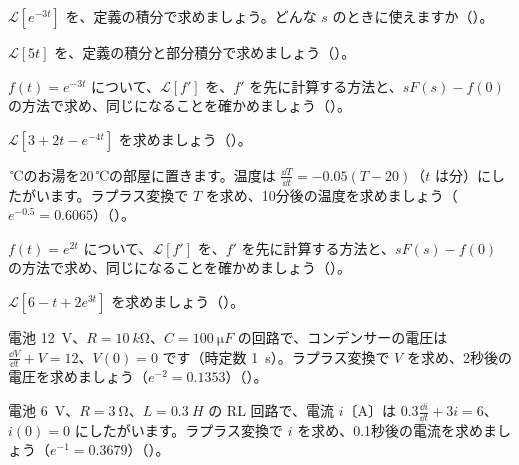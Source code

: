 \bkendproblems
{}

\bkproblem $\mathcal L[e^{-3t}]$ を、定義の積分で求めましょう。どんな $s$ のときに使えますか\mbox{（）}。

\bkproblem $\mathcal L[5t]$ を、定義の積分と部分積分で求めましょう\mbox{（）}。

\bkproblem $f(t)=e^{-3t}$ について、$\mathcal L[f']$ を、$f'$ を先に計算する方法と、$sF(s)-f(0)$ の方法で求め、同じになることを確かめましょう\mbox{（）}。

\bkproblem $\mathcal L[3+2t-e^{-4t}]$ を求めましょう\mbox{（）}。

\,℃のお湯を20\,℃の部屋に置きます。温度は $\tfrac{\dd T}{\dd t}=-0.05(T-20)$（$t$ は分）にしたがいます。ラプラス変換で $T$ を求め、10分後の温度を求めましょう（$e^{-0.5}=0.6065$）\mbox{（）}。

\bkproblem $f(t)=e^{2t}$ について、$\mathcal L[f']$ を、$f'$ を先に計算する方法と、$sF(s)-f(0)$ の方法で求め、同じになることを確かめましょう\mbox{（）}。

\bkproblem $\mathcal L[6-t+2e^{3t}]$ を求めましょう\mbox{（）}。


\bkproblem 電池 \qty{12}{V}、$R=\qty{10}{k\ohm}$、$C=\qty{100}{\micro F}$ の回路で、コンデンサーの電圧は $\tfrac{\dd V}{\dd t}+V=12$、$V(0)=0$ です（時定数 \qty{1}{s}）。ラプラス変換で $V$ を求め、2秒後の電圧を求めましょう（$e^{-2}=0.1353$）\mbox{（）}。

\bkproblem 電池 \qty{6}{V}、$R=\qty{3}{\ohm}$、$L=\qty{0.3}{H}$ の RL 回路で、電流 $i$〔A〕は $0.3\tfrac{\dd i}{\dd t}+3i=6$、$i(0)=0$ にしたがいます。ラプラス変換で $i$ を求め、0.1秒後の電流を求めましょう（$e^{-1}=0.3679$）\mbox{（）}。

